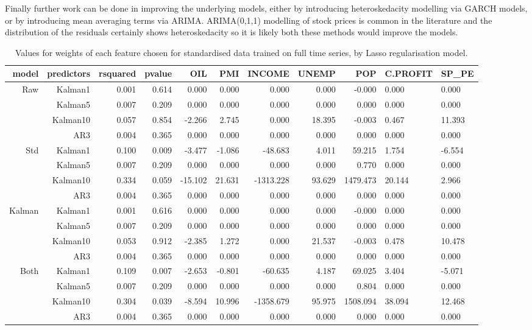 \documentclass{sig-alternate-05-2015}
\begin{document}
Finally further work can be done in improving the underlying models, either by introducing heteroskedacity modelling via GARCH models, or by introducing mean averaging terms via ARIMA. ARIMA(0,1,1) modelling of stock prices is common in the literature and the distribution of the residuals certainly shows heteroskedacity so it is likely both these methods would improve the models. 
 
\begin{table}[t]
\centering
\begin{tabular}{rrrr|rrrrrll}
  \hline
model & predictors & rsquared & pvalue & OIL & PMI & INCOME & UNEMP & POP& C.PROFIT & SP\_PE \\ 
  \hline
\multirow{4}{*}{Raw} & Kalman1 & 0.001 & 0.614 & 0.000 & 0.000 & 0.000 & 0.000 & -0.000 & 0.000 & 0.000  \\ 
& Kalman5 & 0.007 & 0.209 & 0.000 & 0.000 & 0.000 & 0.000 & 0.000 & 0.000 & 0.000 \\ 
& Kalman10 & 0.057 & 0.854 & -2.266 & 2.745 & 0.000 & 18.395 & -0.003 & 0.467 & 11.393  \\ 
& AR3 & 0.004 & 0.365 & 0.000 & 0.000 & 0.000 & 0.000 & 0.000 & 0.000 & 0.000  \\ 
\hline
\multirow{4}{*}{Std} & Kalman1 & 0.100 & 0.009 & -3.477 & -1.086 & -48.683 & 4.011 & 59.215 & 1.754 & -6.554 \\ 
& Kalman5 & 0.007 & 0.209 & 0.000 & 0.000 & 0.000 & 0.000 & 0.770 & 0.000 & 0.000  \\ 
& Kalman10 & 0.334 & 0.059 & -15.102 & 21.631 & -1313.228 & 93.629 & 1479.473 & 20.144 & 2.966  \\ 
& AR3 & 0.004 & 0.365 & 0.000 & 0.000 & 0.000 & 0.000 & 0.000 & 0.000 & 0.000  \\ 
\hline
\multirow{4}{*}{Kalman} & Kalman1 & 0.001 & 0.616 & 0.000 & 0.000 & 0.000 & 0.000 & -0.000 & 0.000 & 0.000  \\ 
& Kalman5 & 0.007 & 0.209 & 0.000 & 0.000 & 0.000 & 0.000 & 0.000 & 0.000 & 0.000  \\ 
& Kalman10 & 0.053 & 0.912 & -2.385 & 1.272 & 0.000 & 21.537 & -0.003 & 0.478 & 10.478  \\ 
& AR3 & 0.004 & 0.365 & 0.000 & 0.000 & 0.000 & 0.000 & 0.000 & 0.000 & 0.000   \\ 
\hline
\multirow{4}{*}{Both} & Kalman1 & 0.109 & 0.007 & -2.653 & -0.801 & -60.635 & 4.187 & 69.025 & 3.404 & -5.071  \\ 
& Kalman5 & 0.007 & 0.209 & 0.000 & 0.000 & 0.000 & 0.000 & 0.804 & 0.000 & 0.000 \\ 
& Kalman10 & 0.304 & 0.039 & -8.594 & 10.996 & -1358.679 & 95.975 & 1508.094 & 38.094 & 12.468 \\ 
& AR3 & 0.004 & 0.365 & 0.000 & 0.000 & 0.000 & 0.000 & 0.000 & 0.000 & 0.000   \\ 
   \hline
\end{tabular}
\caption[caption blah]{ Values for weights of each feature chosen for standardised data trained on full time series, by Lasso regularisation model. \footnotemark}
\end{table}




 
\end{document}
